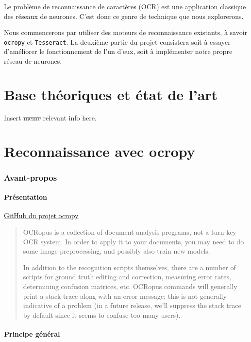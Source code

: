 \documentclass{article}
\begin{document}
Le problème de reconnaissance de caractères (OCR) est une application classique des réseaux de neurones. C'est donc ce genre de technique que nous explorerons.

Nous commencerons par utiliser des moteurs de reconnaissance existants, à savoir \texttt{ocropy} et \texttt{Tesseract}. La deuxième partie du projet consistera soit à essayer d'améliorer le fonctionnement de l'un d'eux, soit à implémenter notre propre réseau de neurones. 

\part{Base théoriques et état de l'art}

Insert \sout{meme} relevant info here.

\part{Reconnaissance avec ocropy}

\section{Avant-propos}


\subsection{Présentation}

\href{https://github.com/tmbdev/ocropy}{GitHub du projet ocropy}

\begin{quotation}
OCRopus is a collection of document analysis programs, not a turn-key OCR system. In order to apply it to your documents, you may need to do some image preprocessing, and possibly also train new models.

In addition to the recognition scripts themselves, there are a number of scripts for ground truth editing and correction, measuring error rates, determining confusion matrices, etc. OCRopus commands will generally print a stack trace along with an error message; this is not generally indicative of a problem (in a future release, we'll suppress the stack trace by default since it seems to confuse too many users).
\end{quotation}

\subsection{Principe général}
\end{document}
